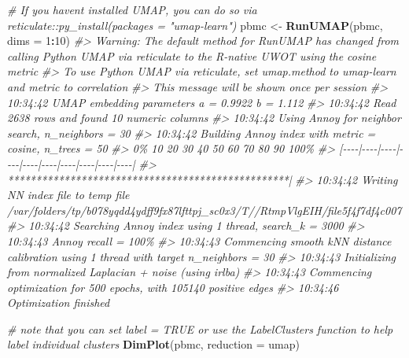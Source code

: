 \documentclass[
]{book}
\newenvironment{Shaded}{\begin{snugshade}}{\end{snugshade}}
\newcommand{\AttributeTok}[1]{\textcolor[rgb]{0.13,0.29,0.53}{#1}}
\newcommand{\CommentTok}[1]{\textcolor[rgb]{0.56,0.35,0.01}{\textit{#1}}}
\newcommand{\DecValTok}[1]{\textcolor[rgb]{0.00,0.00,0.81}{#1}}
\newcommand{\FunctionTok}[1]{\textcolor[rgb]{0.13,0.29,0.53}{\textbf{#1}}}
\newcommand{\NormalTok}[1]{#1}
\newcommand{\OtherTok}[1]{\textcolor[rgb]{0.56,0.35,0.01}{#1}}
\newcommand{\SpecialCharTok}[1]{\textcolor[rgb]{0.81,0.36,0.00}{\textbf{#1}}}
\newcommand{\StringTok}[1]{\textcolor[rgb]{0.31,0.60,0.02}{#1}}
\begin{document}
\begin{Shaded}
\begin{Highlighting}[]
\CommentTok{\# If you haven\textquotesingle{}t installed UMAP, you can do so via reticulate::py\_install(packages = "umap{-}learn")}
\NormalTok{pbmc }\OtherTok{\textless{}{-}} \FunctionTok{RunUMAP}\NormalTok{(pbmc, }\AttributeTok{dims =} \DecValTok{1}\SpecialCharTok{:}\DecValTok{10}\NormalTok{)}
\CommentTok{\#\textgreater{} Warning: The default method for RunUMAP has changed from calling Python UMAP via reticulate to the R{-}native UWOT using the cosine metric}
\CommentTok{\#\textgreater{} To use Python UMAP via reticulate, set umap.method to \textquotesingle{}umap{-}learn\textquotesingle{} and metric to \textquotesingle{}correlation\textquotesingle{}}
\CommentTok{\#\textgreater{} This message will be shown once per session}
\CommentTok{\#\textgreater{} 10:34:42 UMAP embedding parameters a = 0.9922 b = 1.112}
\CommentTok{\#\textgreater{} 10:34:42 Read 2638 rows and found 10 numeric columns}
\CommentTok{\#\textgreater{} 10:34:42 Using Annoy for neighbor search, n\_neighbors = 30}
\CommentTok{\#\textgreater{} 10:34:42 Building Annoy index with metric = cosine, n\_trees = 50}
\CommentTok{\#\textgreater{} 0\%   10   20   30   40   50   60   70   80   90   100\%}
\CommentTok{\#\textgreater{} [{-}{-}{-}{-}|{-}{-}{-}{-}|{-}{-}{-}{-}|{-}{-}{-}{-}|{-}{-}{-}{-}|{-}{-}{-}{-}|{-}{-}{-}{-}|{-}{-}{-}{-}|{-}{-}{-}{-}|{-}{-}{-}{-}|}
\CommentTok{\#\textgreater{} **************************************************|}
\CommentTok{\#\textgreater{} 10:34:42 Writing NN index file to temp file /var/folders/tp/b078yqdd4ydff9fx87lfttpj\_sc0x3/T//RtmpVlgEIH/file5f4f7df4c007}
\CommentTok{\#\textgreater{} 10:34:42 Searching Annoy index using 1 thread, search\_k = 3000}
\CommentTok{\#\textgreater{} 10:34:43 Annoy recall = 100\%}
\CommentTok{\#\textgreater{} 10:34:43 Commencing smooth kNN distance calibration using 1 thread with target n\_neighbors = 30}
\CommentTok{\#\textgreater{} 10:34:43 Initializing from normalized Laplacian + noise (using irlba)}
\CommentTok{\#\textgreater{} 10:34:43 Commencing optimization for 500 epochs, with 105140 positive edges}
\CommentTok{\#\textgreater{} 10:34:46 Optimization finished}
\end{Highlighting}
\end{Shaded}

\begin{Shaded}
\begin{Highlighting}[]
\CommentTok{\# note that you can set \textasciigrave{}label = TRUE\textasciigrave{} or use the LabelClusters function to help label individual clusters}
\FunctionTok{DimPlot}\NormalTok{(pbmc, }\AttributeTok{reduction =} \StringTok{\textquotesingle{}umap\textquotesingle{}}\NormalTok{)}
\end{Highlighting}
\end{Shaded}
\end{document}
